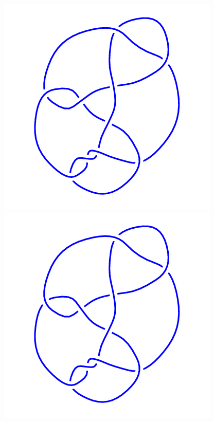 \begin{figure}[H]
\begin{minipage}[b]{.18\linewidth}
    \end{minipage}
    \begin{minipage}[b]{.18\linewidth}
        \centering
        \includegraphics[width=\linewidth]{../data/10_129.png}
    \end{minipage}
    \begin{minipage}[b]{.18\linewidth}
        \centering
        \includegraphics[width=\linewidth]{../data/10_130.png}

\end{minipage}
\end{figure}
